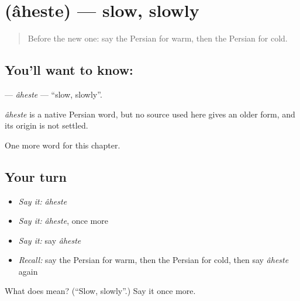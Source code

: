 \section[\texorpdfstring{\fa{آهسته} (âheste)}{آهسته (âheste)}]{ (âheste) — slow, slowly}

\label{lesson:FA-C59-aheste}



\begin{quote}
Before the new one: say the Persian for warm, then the Persian for cold.
\end{quote}

\subsection*{You'll want to know: }
\textbf{} — \emph{âheste} — \textquotedblleft{}slow, slowly\textquotedblright{}.

\begin{cousinweb}
\emph{âheste} is a native Persian word, but no source used here gives an older form, and its origin is not settled.
\end{cousinweb}

\begin{grammarlens}[title={What you've built}]
One more word for this chapter.
\end{grammarlens}

\subsection*{Your turn}
\begin{itemize}
\raggedright
  \item \emph{Say it:} \emph{âheste}
  \item \emph{Say it:} \emph{âheste}, once more
  \item \emph{Say it:} say \emph{âheste}
  \item \emph{Recall:} say the Persian for warm, then the Persian for cold, then say \emph{âheste} again
\end{itemize}

\begin{tcolorbox}[breakable,colback=teal!4,colframe=teal!35!black,title={Before you move on}]
What does  mean? (\textquotedblleft{}Slow, slowly\textquotedblright{}.) Say it once more.
\end{tcolorbox}
